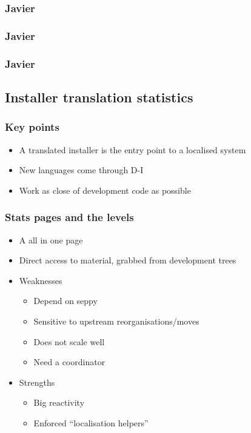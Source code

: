 \documentclass{beamer}
\begin{document}
\begin{frame}
  \frametitle{Javier}
\end{frame}

\begin{frame}
  \frametitle{Javier}
\end{frame}

\begin{frame}
  \frametitle{Javier}
\end{frame}

\subsection{Installer translation statistics}

\begin{frame}
  \frametitle{Key points}
	\begin{itemize}
	\item
		A translated installer is the entry point to a localised system
	\item
		New languages come through D-I
	\item
		Work as close of development code as possible
	\end{itemize}
\end{frame}

\begin{frame}
  \frametitle{Stats pages and the levels}
	\begin{itemize}
	\item
		A all in one page
	\item
		Direct access to material, grabbed from development trees
	\item
		Weaknesses
		\begin{itemize}
		\item
			Depend on seppy
		\item
			Sensitive to upstream reorganisations/moves
		\item
			Does not scale well
		\item
			Need a coordinator
		\end{itemize}
	\item
		Strengths
		\begin{itemize}
		\item
			Big reactivity
		\item
			Enforced ``localisation helpers''
		\end{itemize}
	\end{itemize}
\end{frame}
\end{document}
